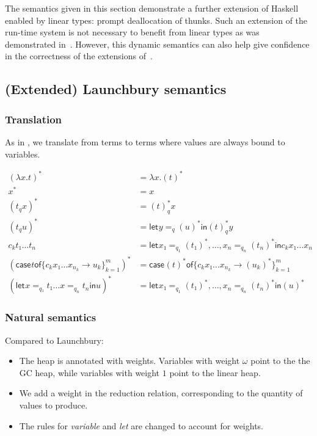 \documentclass[11pt]{article}
\newcommand{\case}[3][]{\mathsf{case}_{#1} #2 \mathsf{of} \{#3\}^m_{k=1}}
\newcommand{\flet}[1][]{\mathsf{let}_{#1} }
\newcommand{\fin}{ \mathsf{in} }
\begin{document}
The semantics given in this section demonstrate a further extension of
Haskell enabled by linear types: prompt deallocation of thunks. Such
an extension of the run-time system is not necessary to benefit from
linear types as was demonstrated in~\label{sec:ghc}. However, this
dynamic semantics can also help give confidence in the correctness of
the extensions of~\label{sec:ghc}.

\subsection{(Extended) Launchbury semantics}
\label{sec:orgheadline11}

\subsubsection{Translation}
\label{sec:orgheadline9}
As in \textcite{launchbury_natural_1993}, we translate from terms to
terms where values are always bound to variables. 


\begin{align*}
(λx. t)^* &= λx. (t)^* \\
x^*       &= x \\
  (t_q  x )^* &= (t)^*_q  x \\
  (t_q  u )^* &= \flet y =_{q} (u)^* \fin (t)^*_q  y \\
c_k  t₁ … t_n &= \flet x₁ =_{q_1} (t₁)^*,…, x_n =_{q_n} (t_n)^* \fin c_k x₁ … x_n \\
(\case t {c_k  x₁ … x_{n_k} → u_k})^* &= \case {(t)^*} {c_k  x₁ … x_{n_k} → (u_k)^*} \\
(\flet x =_{q₁} t₁  …  x =_{q_n} t_n \fin u)^* & = \flet x₁ =_{q_1} (t₁)^*,…, x_n =_{q_n} (t_n)^* \fin (u)^*
\end{align*}

\subsubsection{Natural semantics}
Compared to Launchbury:

\begin{itemize}
\item The heap is annotated with weights. Variables with weight $ω$
  point to the the GC heap, while variables with weight $1$ point to
  the linear heap.
\item We add a weight in the reduction relation, corresponding to the
  quantity of values to produce.
\item The rules for \emph{variable} and \emph{let} are changed to
  account for weights.
\end{itemize}
\end{document}
